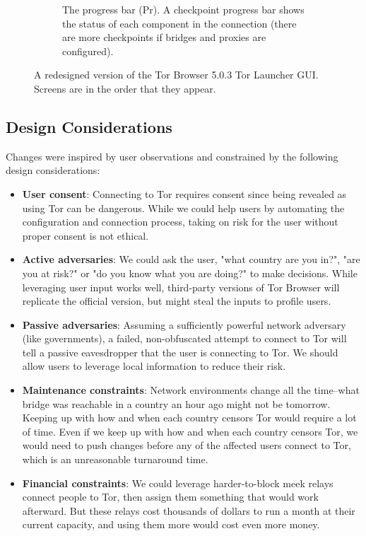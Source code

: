 \documentclass[USenglish,oneside,twocolumn]{article}
\begin{document}
\begin{figure}
\begin{subfigure}[b]{0.30\textwidth}
	\centering\captionsetup{width=1.5\linewidth}%
	\caption{The progress bar (Pr). A checkpoint progress bar shows the status of each component in the connection (there are more checkpoints if bridges and proxies are configured).}
	\label{fig:new-progress}
\end{subfigure}
\caption{
A redesigned version of the Tor Browser 5.0.3 Tor Launcher GUI. Screens are in the order that they appear. 
}
\label{fig:new-interface}
\end{figure} 

\subsection {Design Considerations} 

Changes were inspired by user observations and constrained by the following design considerations: 

\begin{itemize}
\item {\bfseries User consent}: Connecting to Tor requires consent since being revealed as using Tor can be dangerous. While we could help users by automating the configuration and connection process, taking on risk for the user without proper consent is not ethical. 

\item{\bfseries Active adversaries}: We could ask the user, "what country are you in?", "are you at risk?" or "do you know what you are doing?" to make decisions. While leveraging user input works well, third-party versions of Tor Browser will replicate the official version, but might steal the inputs to profile users. 

\item {\bfseries  Passive adversaries}: Assuming a sufficiently powerful network adversary (like governments), a failed, non-obfuscated attempt to connect to Tor will tell a passive eavesdropper that the user is connecting to Tor. We should allow users to leverage local information to reduce their risk.

\item{\bfseries  Maintenance constraints}: Network environments change all the time--what bridge was reachable in a country an hour ago might not be tomorrow. Keeping up with how and when each country censors Tor would require a lot of time. Even if we keep up with how and when each country censors Tor, we would need to push changes before any of the affected users connect to Tor, which is an unreasonable turnaround time.

\item{\bfseries  Financial constraints}: We could leverage harder-to-block meek relays connect people to Tor, then assign them something that would work afterward. But these relays cost thousands of dollars to run a month at their current capacity, and using them more would cost even more money.
\end{itemize}
\end{document}
